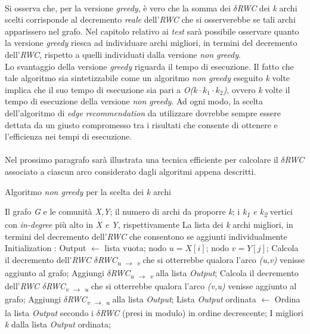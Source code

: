 \\Si osserva che, per la versione \textit{greedy}, è vero che la somma dei \textit{$\delta$RWC} dei \textit{k} archi scelti corrisponde al decremento \textit{reale} dell'\textit{RWC} che si osserverebbe se tali archi apparissero nel grafo. Nel capitolo relativo ai \textit{test} sarà possibile osservare quanto la versione \textit{greedy} riesca ad individuare archi migliori, in termini del decremento dell'\textit{RWC}, rispetto a quelli individuati dalla versione \textit{non greedy}.
\\Lo svantaggio della versione \textit{greedy} riguarda il tempo di esecuzione. Il fatto che tale algoritmo sia sintetizzabile come un algoritmo \textit{non greedy} eseguito \textit{k} volte implica che il suo tempo di esecuzione sia pari a \textit{O($k \cdot k_1 \cdot k_2$)}, ovvero \textit{k} volte il tempo di esecuzione della versione \textit{non greedy}. Ad ogni modo, la scelta dell'algoritmo di \textit{edge recommendation} da utilizzare dovrebbe sempre essere dettata da un giusto compromesso tra i risultati che consente di ottenere e l'efficienza nei tempi di esecuzione.
\\\\
Nel prossimo paragrafo sarà illustrata una tecnica efficiente per calcolare il \textit{$\delta$RWC} associato a ciascun arco considerato dagli algoritmi appena descritti.
\begin{algorithm}
\caption{Algoritmo \textit{non greedy} per la scelta dei \textit{k} archi}
\begin{algorithmic} 
\REQUIRE Il grafo \textit{G} e le comunità \textit{X,Y}; il numero di archi da proporre \textit{k}; i \textit{k\textsubscript{1} e k\textsubscript{2}} vertici con \textit{in-degree} più alto in \textit{X e Y}, rispettivamente 
\ENSURE La lista dei \textit{k} archi migliori, in termini del decremento dell'\textit{RWC} che consentono se aggiunti individualmente
\STATE Initialization : Output $\leftarrow$ lista vuota;
\STATE nodo $u = X[i]$;
\STATE nodo $v = Y[j]$;
\STATE Calcola il decremento dell'\textit{RWC $\delta$RWC\textsubscript{u $\rightarrow$ v}} che si otterrebbe qualora l'arco \textit{(u,v)} venisse aggiunto al grafo;
\STATE Aggiungi \textit{$\delta$RWC\textsubscript{u $\rightarrow$ v}} alla lista \textit{Output};
\STATE Calcola il decremento dell'\textit{RWC $\delta$RWC\textsubscript{v $\rightarrow$ u}} che si otterrebbe qualora l'arco \textit{(v,u)} venisse aggiunto al grafo;
\STATE Aggiungi \textit{$\delta$RWC\textsubscript{v $\rightarrow$ u}} alla lista \textit{Output};
\ENDFOR
\ENDFOR
\STATE Lista \textit{Output} ordinata $\leftarrow$ Ordina la lista \textit{Output} secondo i \textit{$\delta$RWC} (presi in modulo) in ordine decrescente;
\RETURN I migliori \textit{k} dalla lista \textit{Output} ordinata;
\end{algorithmic}
\end{algorithm}

